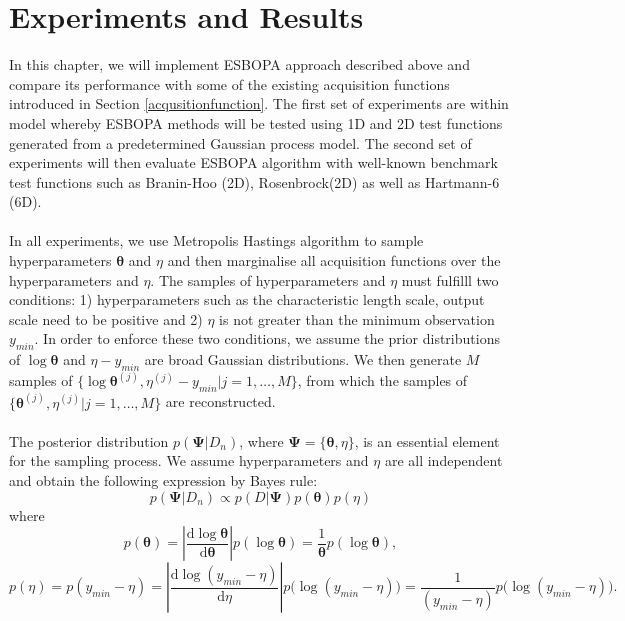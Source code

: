 \documentclass[a4paper,11pt]{report}
\begin{document}

\chapter{Experiments and Results}
In this chapter, we will implement ESBOPA approach described above and compare its performance with some of the existing acquisition functions introduced in Section \ref{acqusitionfunction}. The first set of experiments are within model whereby ESBOPA methods will be tested using 1D and 2D test functions generated from a predetermined Gaussian process model. The second set of experiments will then evaluate ESBOPA algorithm with well-known benchmark test functions such as Branin-Hoo (2D), Rosenbrock(2D) as well as  Hartmann-6 (6D). 
\\\\
In all experiments, we use Metropolis Hastings algorithm \cite{bishop2006pattern} to sample hyperparameters $\boldsymbol{\theta}$ and $\eta$ and then marginalise all acquisition functions over the hyperparameters and $\eta$. The samples of hyperparameters and $\eta$ must fulfilll two conditions: 1) hyperparameters such as the characteristic length scale, output scale need to be positive and 2) $\eta$ is not greater than the minimum observation $y_{min}$. In order to enforce these two conditions, we assume the prior distributions of $ \log \boldsymbol{\theta}$ and $\eta - y_{min}$ are broad Gaussian distributions. We then generate $M$ samples of $ \{ \log \boldsymbol{\theta}^{(j)}, \eta^{(j)} - y_{min} \vert j=1, \dots, M \} $, from which the samples of $\{\boldsymbol{\theta}^{(j)}, \eta^{(j)} \vert j=1, \dots, M \}$ are reconstructed. 
\\\\
The posterior distribution $p(\boldsymbol{\Psi} \vert D_n)$, where $\boldsymbol{\Psi}=\{ \boldsymbol{\theta}, \eta \}$, is an essential element for the sampling process. We assume hyperparameters and $\eta$ are all independent and obtain the following expression by Bayes rule: 
 \[ p(\boldsymbol{\Psi} \vert D_n) \propto p( D \vert \boldsymbol{\Psi} ) p (\boldsymbol{\theta}) p(\eta) \]
 where 
 \[ p (\boldsymbol{\theta}) = \left \lvert \frac{ \mathrm{d} \log \boldsymbol{\theta}} { \mathrm{d} \boldsymbol{\theta}} \right \rvert p( \log \boldsymbol{\theta})= \frac{1} {\boldsymbol{\theta}} p( \log \boldsymbol{\theta}) ,\]
 \[ p(\eta) = p(y_{min}- \eta) = \left \lvert \frac{\mathrm{d} \log (y_{min}- \eta)} {\mathrm{d} \eta} \right \rvert p \big( \log (y_{min}- \eta) \big) =  \frac{1} { (y_{min}- \eta)} p \big( \log (y_{min}- \eta) \big) . \]
\end{document}
